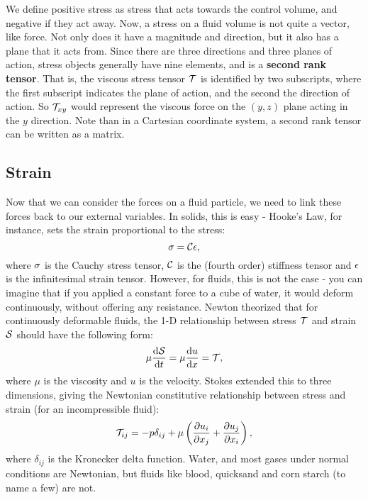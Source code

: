We define positive stress as stress that acts towards the control volume, and negative if they act away. Now, a stress on a fluid volume is not quite a vector, like force. Not only does it have a magnitude and direction, but it also has a plane that it acts from. Since there are three directions and three planes of action, stress objects generally have nine elements, and is a {\bf second rank tensor}. That is, the viscous stress tensor $\mathcal{T}$ is identified by two subscripts, where the first subscript indicates the plane of action, and the second the direction of action. So $\mathcal{T}_{xy}$ would represent the viscous force on the $(y,z)$ plane acting in the $y$ direction. Note than in a Cartesian coordinate system, a second rank tensor can be written as a matrix. 

\subsection{Strain}
Now that we can consider the forces on a fluid particle, we need to link these forces back to our external variables. In solids, this is easy - Hooke's Law, for instance, sets the strain proportional to the stress:
\begin{equation}
\mathbf{\sigma} = \mathcal{C}\mathbf{\epsilon},
\end{equation}
where $\mathbf{\sigma}$ is the Cauchy stress tensor, $\mathcal{C}$ is the (fourth order) stiffness tensor and $\mathbf{\epsilon}$ is the infinitesimal strain tensor. However, for fluids, this is not the case - you can imagine that if you applied a constant force to a cube of water, it would deform continuously, without offering any resistance. Newton theorized that for continuously deformable fluids, the 1-D relationship between stress $\mathcal{T}$ and strain $\mathcal{S}$ should have the following form:
\begin{equation}
\mu \der{1}{\Tensor{S}}{t} = \mu \der{1}{u}{x}=\Tensor{T}, 
\end{equation}
where $\mu$ is the viscosity and $u$ is the velocity.  Stokes extended this to three dimensions, giving the Newtonian constitutive relationship between stress and strain (for an incompressible fluid):
\begin{equation}\label{eq:constitutive}
\Tensor{T}_{ij} = -p\delta_{ij} + \mu\paren{\pder{1}{u_{i}}{x_j} + \pder{1}{u_j}{x_i}},
\end{equation}
where $\delta_{ij}$ is the Kronecker delta function. Water, and most gases under normal conditions are Newtonian, but fluids like blood, quicksand and corn starch (to name a few) are not. 


